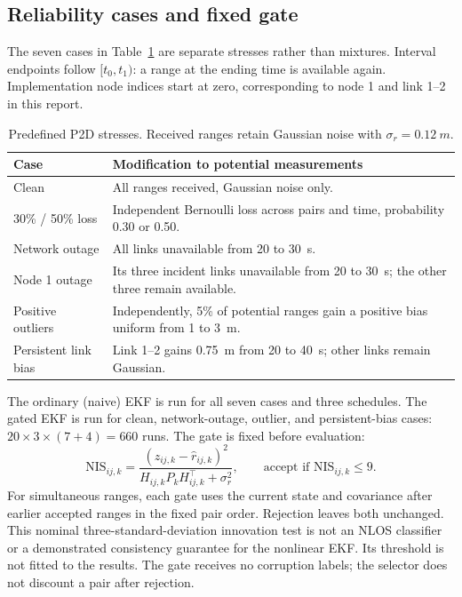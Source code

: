 \subsection{Reliability cases and fixed gate}
The seven cases in Table~\ref{tab:p2d_protocol} are separate stresses rather than mixtures. Interval endpoints follow \([t_0,t_1)\): a range at the ending time is available again. Implementation node indices start at zero, corresponding to node 1 and link 1--2 in this report.
\begin{table}[htbp]
\centering
\caption{Predefined P2D stresses. Received ranges retain Gaussian noise with \(\sigma_r=\SI{0.12}{m}\).}
\label{tab:p2d_protocol}
\begin{tabular}{lp{9.8cm}}
\toprule
Case & Modification to potential measurements \\
\midrule
Clean & All ranges received, Gaussian noise only. \\
30\% / 50\% loss & Independent Bernoulli loss across pairs and time, probability 0.30 or 0.50. \\
Network outage & All links unavailable from 20 to \SI{30}{s}. \\
Node 1 outage & Its three incident links unavailable from 20 to \SI{30}{s}; the other three remain available. \\
Positive outliers & Independently, 5\% of potential ranges gain a positive bias uniform from 1 to \SI{3}{m}. \\
Persistent link bias & Link 1--2 gains \SI{0.75}{m} from 20 to \SI{40}{s}; other links remain Gaussian. \\
\bottomrule
\end{tabular}
\end{table}

The ordinary (naive) EKF is run for all seven cases and three schedules. The gated EKF is run for clean, network-outage, outlier, and persistent-bias cases: \(20\times3\times(7+4)=660\) runs. The gate is fixed before evaluation:
\begin{equation}
 \mathrm{NIS}_{ij,k}=\frac{(z_{ij,k}-\hat r_{ij,k})^2}{H_{ij,k}P_kH_{ij,k}^{\top}+\sigma_r^2},
 \qquad\text{accept if }\mathrm{NIS}_{ij,k}\leq9.
\end{equation}
For simultaneous ranges, each gate uses the current state and covariance after earlier accepted ranges in the fixed pair order. Rejection leaves both unchanged. This nominal three-standard-deviation innovation test is not an NLOS classifier or a demonstrated consistency guarantee for the nonlinear EKF. Its threshold is not fitted to the results. The gate receives no corruption labels; the selector does not discount a pair after rejection.

